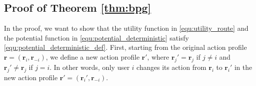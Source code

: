 \documentclass[journal]{IEEEtran}
\newcommand{\bs}[1]{\boldsymbol{#1}}
\begin{document}
\subsection{Proof of Theorem \ref{thm:bpg}} \label{app:bpg}

  In the proof, we want to show that the utility function in \eqref{equ:utility_route} and the potential function in \eqref{equ:potential_deterministic} satisfy \eqref{equ:potential_deterministic_def}.
  First, starting from the original action profile $\bs{r} = (\bs{r}_i, \bs{r}_{-i})$, we define a new action profile $\bs{r}'$, where $\bs{r}_j' = \bs{r}_j$ if $j \neq i$ and $\bs{r}_j' \neq \bs{r}_j$ if $j = i$. In other words, only user $i$ changes its action from $\bs{r}_i$ to $\bs{r}_i'$ in the new action profile $\bs{r}' = (\bs{r}_i', \bs{r}_{-i})$. 
	
\end{document}

